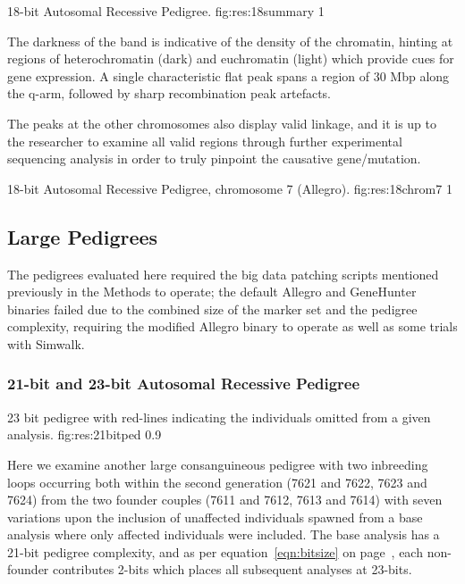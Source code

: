 	{18-bit Autosomal Recessive Pedigree.}
	{fig:res:18summary}
	{1}{}
	
The darkness of the band is indicative of the density of the chromatin, hinting at regions of heterochromatin (dark) and euchromatin (light) which provide cues for gene expression. A single characteristic flat peak spans a region of 30 Mbp along the q-arm, followed by sharp recombination peak artefacts.

The peaks at the other chromosomes also display valid linkage, and it is up to the researcher to examine all valid regions through further experimental sequencing analysis in order to truly pinpoint the causative gene/mutation.

	{18-bit Autosomal Recessive Pedigree, chromosome 7 (Allegro).}
	{fig:res:18chrom7}
	{1}{}


\subsection{Large Pedigrees}

The pedigrees evaluated here required the big data patching scripts mentioned previously in the Methods to operate; the default Allegro and GeneHunter binaries failed due to the combined size of the marker set and the pedigree complexity, requiring the modified Allegro binary to operate as well as some trials with Simwalk.

\subsubsection*{21-bit and 23-bit Autosomal Recessive Pedigree}

	{23 bit pedigree with red-lines indicating the individuals omitted from a given analysis.}
	{fig:res:21bitped}
	{0.9}{}

Here we examine another large consanguineous pedigree with two inbreeding loops occurring both within the second generation (7621 and 7622, 7623 and 7624) from the two founder couples (7611 and 7612, 7613 and 7614) with seven variations upon the inclusion of unaffected individuals spawned from a base analysis where only affected individuals were included. The base analysis has a 21-bit pedigree complexity, and as per equation~\ref{eqn:bitsize} on page~\pageref{eqn:bitsize}, each non-founder contributes 2-bits which places all subsequent analyses at 23-bits.

